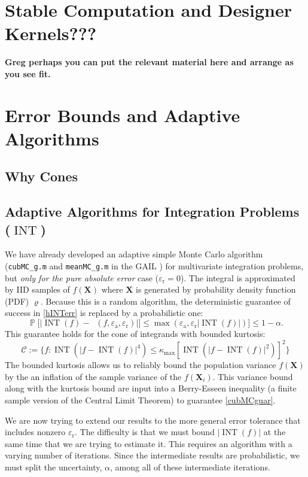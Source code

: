 \documentclass[11pt]{NSFamsart}
\DeclareMathOperator{\INT}{INT}
\DeclareMathOperator{\hINT}{\widehat{\INT}}
\newcommand{\bX}{{\boldsymbol{X}}}
\newcommand{\calc}{{\mathcal{C}}}
\DeclareMathOperator{\Prob}{\mathbb{P}}
\def\abs#1{\ensuremath{\left \lvert #1 \right \rvert}}
\newcommand{\bigabs}[1]{\ensuremath{\bigl \lvert #1 \bigr \rvert}}
\newcommand{\abstol}{\varepsilon_{\text{a}}}
\newcommand{\reltol}{\varepsilon_{\text{r}}}
\begin{document}
\section{Stable Computation and Designer Kernels???} {\bf Greg perhaps you can put the relevant material here and arrange as you see fit.}

\section{Error Bounds and Adaptive Algorithms}
\subsection*{Why Cones}
\subsection*{Adaptive Algorithms for Integration Problems ($\INT$)}  We have already developed an adaptive simple Monte Carlo algorithm \citep{HicEtal14b} (\texttt{cubMC\_g.m} and \texttt{meanMC\_g.m} in the GAIL \citep{ChoEtal14a}) for multivariate integration problems, but \emph{only for the pure absolute error} case ($\reltol=0$).  The integral is approximated by IID samples of $f(\bX)$ where $\bX$ is generated by probability density function (PDF) $\varrho$. Because this is a random algorithm, the deterministic guarantee of success in \eqref{hINTerr} is replaced by a probabilistic one:
\begin{equation} \label{cubMCguar}
 \Prob\bigl[\bigabs{\INT(f) -\hINT(f,\abstol,\reltol)} \bigr ] \le \max(\abstol,\reltol \abs{\INT(f)}) \bigr] \le 1-\alpha.
\end{equation}
This guarantee holds for the cone of integrands with bounded kurtosis: 
\begin{equation}
\calc := \bigl \{ f : \INT(\abs{f - \INT(f)}^4) \le \kappa_{\max} [\INT(\abs{f - \INT(f)}^2)]^2 \bigr\}
\end{equation} 
The bounded kurtosis allows us to reliably bound the population variance $f(\bX)$ by the an inflation of the sample variance of the $f(\bX_i)$. This variance bound along with the kurtosis bound are input into a Berry-Esseen inequality (a finite sample version of the Central Limit Theorem) to guarantee \eqref{cubMCguar}.

We are now trying to extend our results to the more general error tolerance that includes nonzero $\reltol$.  The difficulty is that we must bound $\abs{\INT(f)}$ at the same time that we are trying to estimate it.  This requires an algorithm with a varying number of iterations.  Since the intermediate results are probabilistic, we must split the uncertainty, $\alpha$, among all of these intermediate iterations.
\end{document}
